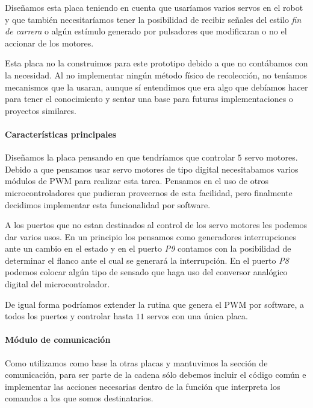 Dise\~namos esta placa teniendo en cuenta que usar\'iamos varios servos en el robot y que tambi\'en
necesitar\'iamos tener la posibilidad de recibir se\~nales del estilo \emph{fin de carrera} o alg\'un
est\'imulo generado por pulsadores que modificaran o no el accionar de los motores.

Esta placa no la construimos para este prototipo debido a que no cont\'abamos con la necesidad.
Al no implementar ning\'un m\'etodo f\'isico de recolecci\'on, no ten\'iamos mecanismos que la
usaran, aunque s\'i entendimos que era algo que deb\'iamos hacer para tener el conocimiento y sentar
una base para futuras implementaciones o proyectos similares.

\paragraph{Caracter\'isticas principales}
\label{h_placas_servos_caracteristicas}

Dise\~namos la placa pensando en que tendr\'iamos que controlar $5$ servo motores.
Debido a que pensamos usar servo motores de tipo digital necesitabamos varios m\'odulos de PWM para
realizar esta tarea.
Pensamos en el uso de otros microcontroladores que pudieran proveernos de esta facilidad, pero finalmente
decidimos implementar esta funcionalidad por software.

A los puertos que no estan destinados al control de los servo motores les podemos dar varios usos.
En un principio los pensamos como generadores interrupciones ante un cambio en el estado y en el
puerto \emph{P9} contamos con la posibilidad de determinar el flanco ante el cual se generar\'a la
interrupci\'on.
En el puerto \emph{P8} podemos colocar alg\'un tipo de sensado que haga uso del conversor anal\'ogico
digital del microcontrolador.

De igual forma podr\'iamos extender la rutina que genera el PWM por software, a todos los puertos y
controlar hasta $11$ servos con una \'unica placa.

\paragraph{M\'odulo de comunicaci\'on}
\label{h_placas_servos_comm}

Como utilizamos como base la otras placas y mantuvimos la secci\'on de comunicaci\'on, para ser parte
de la cadena s\'olo debemos incluir el c\'odigo com\'un e implementar las acciones necesarias dentro
de la funci\'on que interpreta los comandos a los que somos destinatarios.

